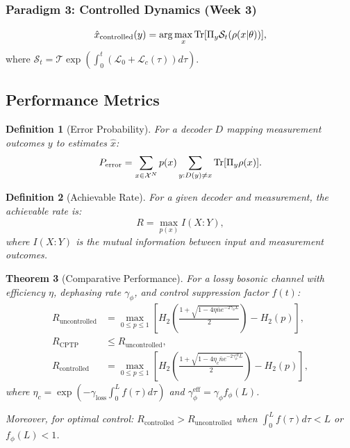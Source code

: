 \documentclass[12pt]{article}
\newtheorem{theorem}{Theorem}[section]
\newtheorem{definition}[theorem]{Definition}
\begin{document}
\subsubsection{Paradigm 3: Controlled Dynamics (Week 3)}
\begin{equation}
    \hat{x}_{\text{controlled}}(y) = \arg\max_x \Tr[\Pi_y \mathcal{S}_t(\rho(x|\theta))],
\end{equation}
where \(\mathcal{S}_t = \mathcal{T}\exp\left(\int_0^t (\mathcal{L}_0 + \mathcal{L}_c(\tau))d\tau\right)\).

\subsection{Performance Metrics}

\begin{definition}[Error Probability]
For a decoder \(D\) mapping measurement outcomes \(y\) to estimates \(\hat{x}\):
\begin{equation}
    P_{\text{error}} = \sum_{x\in\mathcal{X}^N} p(x) \sum_{y: D(y)\neq x} \Tr[\Pi_y \rho(x)].
\end{equation}
\end{definition}

\begin{definition}[Achievable Rate]
For a given decoder and measurement, the achievable rate is:
\begin{equation}
    R = \max_{p(x)} I(X:Y),
\end{equation}
where \(I(X:Y)\) is the mutual information between input and measurement outcomes.
\end{definition}

\begin{theorem}[Comparative Performance]
For a lossy bosonic channel with efficiency \(\eta\), dephasing rate \(\gamma_\phi\), and control suppression factor \(f(t)\):
\begin{align}
    R_{\text{uncontrolled}} &= \max_{0\leq p\leq 1} \left[H_2\left(\frac{1+\sqrt{1-4\eta\bar{n}e^{-2\gamma_\phi L}}}{2}\right) - H_2(p)\right], \\
    R_{\text{CPTP}} &\leq R_{\text{uncontrolled}}, \\
    R_{\text{controlled}} &= \max_{0\leq p\leq 1} \left[H_2\left(\frac{1+\sqrt{1-4\eta_c\bar{n}e^{-2\gamma_\phi^{\text{eff}} L}}}{2}\right) - H_2(p)\right],
\end{align}
where \(\eta_c = \exp\left(-\gamma_{\text{loss}}\int_0^L f(\tau)d\tau\right)\) and \(\gamma_\phi^{\text{eff}} = \gamma_\phi f_\phi(L)\).

Moreover, for optimal control: \(R_{\text{controlled}} > R_{\text{uncontrolled}}\) when \(\int_0^L f(\tau)d\tau < L\) or \(f_\phi(L) < 1\).
\end{theorem}
\end{document}
